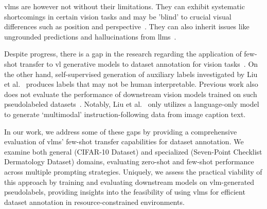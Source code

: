 \documentclass[../ShajiS_RnDReport.tex]{subfiles}
\begin{document}
\Glspl{vlm} are however not without their limitations. They can exhibit systematic shortcomings in certain vision tasks and may be 'blind' to crucial visual differences such as position and perspective~\cite{Doveh2023,Tong2024}. They can also inherit issues like ungrounded predictions and hallucinations from \glspl{llm}~\cite{Alayrac2022,Li2023c}.

Despite progress, there is a gap in the research regarding the application of few-shot transfer to \gls{vl} generative models to dataset annotation for vision tasks~\cite{Tan2024,Zhang2024}. On the other hand, self-supervised generation of auxiliary labels investigated by Liu et al.~\cite{Liu2019} produces labels that may not be human interpretable. Previous work also does not evaluate the performance of downstream vision models trained on such pseudolabeled datasets~\cite{Liu2019,Liu2023a}. Notably, Liu et al.~\cite{Liu2023a} only utilizes a language-only model to generate `multimodal' instruction-following data from image caption text.

In our work, we address some of these gaps by providing a comprehensive evaluation of \glspl{vlm}' few-shot transfer capabilities for dataset annotation. We examine both general (CIFAR-10 Dataset) and specialized (Seven-Point Checklist Dermatology Dataset) domains, evaluating zero-shot and few-shot performance across multiple prompting strategies. Uniquely, we assess the practical viability of this approach by training and evaluating downstream models on \gls{vlm}-generated pseudolabels, providing insights into the feasibility of using \glspl{vlm} for efficient dataset annotation in resource-constrained environments.
\end{document}
